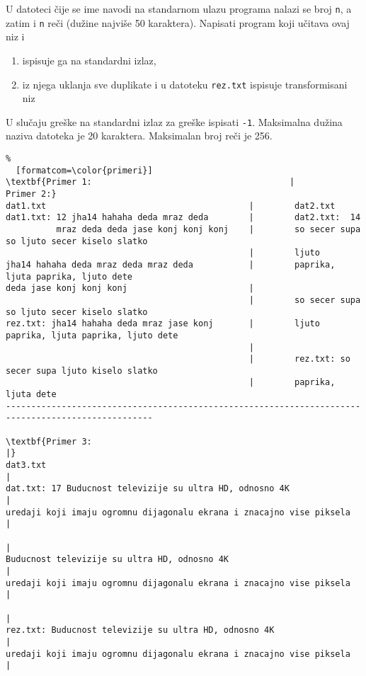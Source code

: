 \documentclass{article}
\begin{document}
\begin{z}
 U datoteci \v cije se ime navodi na standarnom ulazu
  programa nalazi se broj \verb|n|, a zatim i \verb|n| re\v ci (du\v zine
  najvi\v se 50 karaktera). Napisati program koji u\v citava ovaj niz
  i
  \begin{enumerate}
  \item ispisuje ga na standardni izlaz,
  \item iz njega uklanja sve duplikate i u datoteku \verb|rez.txt|
    ispisuje transformisani niz
  \end{enumerate}
  U slučaju greške na standardni izlaz za greške ispisati {\tt -1}. Maksimalna du\v zina naziva datoteka je 20 karaktera. Maksimalan broj reči je 256.
\end{z}


\begin{Verbatim}%
  [formatcom=\color{primeri}] 
\textbf{Primer 1:                                       |        Primer 2:}
dat1.txt                                        |        dat2.txt
dat1.txt: 12 jha14 hahaha deda mraz deda        |        dat2.txt:  14
          mraz deda deda jase konj konj konj    |        so secer supa so ljuto secer kiselo slatko
                                                |        ljuto
jha14 hahaha deda mraz deda mraz deda           |        paprika, ljuta paprika, ljuto dete
deda jase konj konj konj                        | 
                                                |        so secer supa so ljuto secer kiselo slatko 
rez.txt: jha14 hahaha deda mraz jase konj       |        ljuto paprika, ljuta paprika, ljuto dete  
                                                |
                                                |        rez.txt: so secer supa ljuto kiselo slatko
                                                |        paprika, ljuta dete
---------------------------------------------------------------------------------------------------

\textbf{Primer 3:                                                                  |}
dat3.txt                                                                   |      
dat.txt: 17 Buducnost televizije su ultra HD, odnosno 4K                   |       
uredaji koji imaju ogromnu dijagonalu ekrana i znacajno vise piksela       |      
                                                                           |
Buducnost televizije su ultra HD, odnosno 4K                               |
uredaji koji imaju ogromnu dijagonalu ekrana i znacajno vise piksela       |
                                                                           |
rez.txt: Buducnost televizije su ultra HD, odnosno 4K                      |
uredaji koji imaju ogromnu dijagonalu ekrana i znacajno vise piksela       |
\end{Verbatim}
\end{document}
